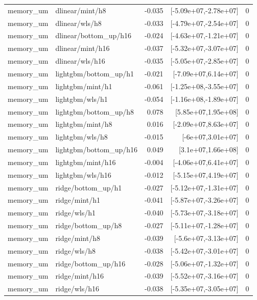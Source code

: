\begin{tabular}{llrrr}
memory_um & dlinear/mint/h8 & -0.035 & [-5.09e+07,-2.78e+07] & 0 \\
memory_um & dlinear/wls/h8 & -0.033 & [-4.79e+07,-2.54e+07] & 0 \\
memory_um & dlinear/bottom_up/h16 & -0.024 & [-4.63e+07,-1.21e+07] & 0 \\
memory_um & dlinear/mint/h16 & -0.037 & [-5.32e+07,-3.07e+07] & 0 \\
memory_um & dlinear/wls/h16 & -0.035 & [-5.05e+07,-2.85e+07] & 0 \\
memory_um & lightgbm/bottom_up/h1 & -0.021 & [-7.09e+07,6.14e+07] & 0 \\
memory_um & lightgbm/mint/h1 & -0.061 & [-1.25e+08,-3.55e+07] & 0 \\
memory_um & lightgbm/wls/h1 & -0.054 & [-1.16e+08,-1.89e+07] & 0 \\
memory_um & lightgbm/bottom_up/h8 & 0.078 & [5.85e+07,1.95e+08] & 0 \\
memory_um & lightgbm/mint/h8 & 0.016 & [-2.09e+07,8.63e+07] & 0 \\
memory_um & lightgbm/wls/h8 & -0.015 & [-6e+07,3.01e+07] & 0 \\
memory_um & lightgbm/bottom_up/h16 & 0.049 & [3.1e+07,1.66e+08] & 0 \\
memory_um & lightgbm/mint/h16 & -0.004 & [-4.06e+07,6.41e+07] & 0 \\
memory_um & lightgbm/wls/h16 & -0.012 & [-5.15e+07,4.19e+07] & 0 \\
memory_um & ridge/bottom_up/h1 & -0.027 & [-5.12e+07,-1.31e+07] & 0 \\
memory_um & ridge/mint/h1 & -0.041 & [-5.87e+07,-3.26e+07] & 0 \\
memory_um & ridge/wls/h1 & -0.040 & [-5.73e+07,-3.18e+07] & 0 \\
memory_um & ridge/bottom_up/h8 & -0.027 & [-5.11e+07,-1.28e+07] & 0 \\
memory_um & ridge/mint/h8 & -0.039 & [-5.6e+07,-3.13e+07] & 0 \\
memory_um & ridge/wls/h8 & -0.038 & [-5.42e+07,-3.01e+07] & 0 \\
memory_um & ridge/bottom_up/h16 & -0.028 & [-5.06e+07,-1.32e+07] & 0 \\
memory_um & ridge/mint/h16 & -0.039 & [-5.52e+07,-3.16e+07] & 0 \\
memory_um & ridge/wls/h16 & -0.038 & [-5.35e+07,-3.05e+07] & 0 \\
\end{tabular}